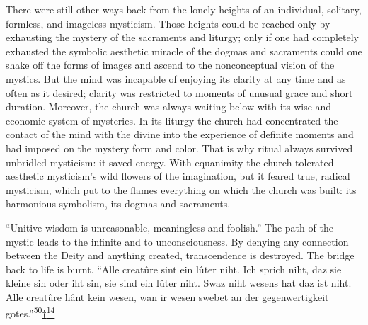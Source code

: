 There were still other ways back from the lonely heights of an
individual, solitary, formless, and imageless mysticism. Those heights
could be reached only by exhausting the mystery of the sacraments and
liturgy; only if one had completely exhausted the symbolic aesthetic
miracle of the dogmas and sacraments could one shake off the forms of
images and ascend to the nonconceptual vision of the mystics. But the
mind was incapable of enjoying its clarity at any time and as often as
it desired; clarity was restricted to moments of unusual grace and short
duration. Moreover, the church was always waiting below with its wise
and economic system of mysteries. In its liturgy the church had
concentrated the contact of the mind with the divine into the experience
of definite moments and had imposed on the mystery form and color. That
is why ritual always survived unbridled mysticism: it saved energy. With
equanimity the church tolerated aesthetic mysticism's wild flowers of
the imagination, but it feared true, radical mysticism, which put to the
flames everything on which the church was built: its harmonious
symbolism, its dogmas and sacraments.

``Unitive wisdom is unreasonable, meaningless and foolish.'' The path of
the mystic leads to the infinite and to unconsciousness. By denying any
connection between the Deity and anything created, transcendence is
destroyed. The bridge back to life is burnt. ``Alle creatûre sint ein
lûter niht. Ich sprich niht, daz sie kleine sin oder iht sin, sie sind
ein lûter niht. Swaz niht wesens hat daz ist niht. Alle creatûre hânt
kein wesen, wan ir wesen swebet an der gegenwertigkeit
gotes.''\textsuperscript{\protect\hypertarget{17_Chapter_Ten__THE_FAILURE_OF_IMAG.xhtmlux5cux23id_637}{\protect\hyperlink{23_NOTES.xhtmlux5cux23id_638}{50}}}\protect\hypertarget{17_Chapter_Ten__THE_FAILURE_OF_IMAG.xhtmlux5cux23id_2605}{\protect\hyperlink{23_NOTES.xhtmlux5cux23id_2606}{†\textsuperscript{14}}}

